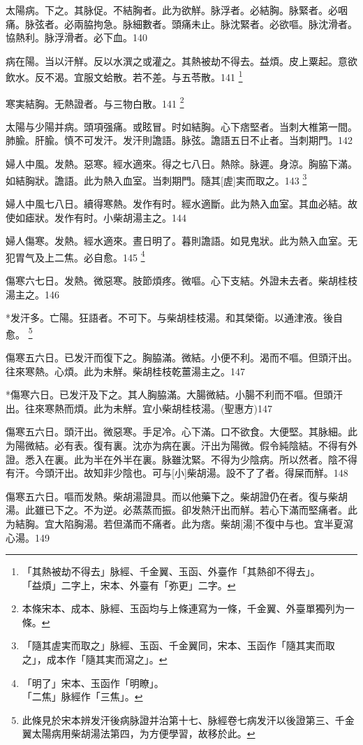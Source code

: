 \documentclass[12pt,twoside,UTF8,b5paper]{ctexbook}
\begin{document}
太陽病。下之。其脉促。不結胸者。此为欲觧。脉浮者。必結胸。脉緊者。必咽痛。脉弦者。必兩脇拘急。脉細數者。頭痛未止。脉沈緊者。必欲嘔。脉沈滑者。協熱利。脉浮滑者。必下血。140

病在陽。当以汗觧。反以水潠之或灌之。其熱被劫不得去。益煩。皮上粟起。意欲飲水。反不渴。宜服文蛤散。若不差。与五苓散。141
	\footnote{「其熱被劫不得去」脉經、千金翼、玉函、外臺作「其熱卻不得去」。\\「益煩」二字上，宋本、外臺有「弥更」二字。}

寒実結胸。无熱證者。与三物白散。141
	\footnote{本條宋本、成本、脉經、玉函均与上條連寫为一條，千金翼、外臺單獨列为一條。}

太陽与少陽并病。頭項强痛。或眩冒。时如結胸。心下痞堅者。当刺大椎第一間。肺腧。肝腧。慎不可发汗。发汗則譫語。脉弦。譫語五日不止者。当刺期門。142

婦人中風。发熱。惡寒。經水適來。得之七八日。熱除。脉遲。身涼。胸脇下滿。如結胸狀。譫語。此为熱入血室。当刺期門。隨其[虗]実而取之。143
	\footnote{「隨其虗実而取之」脉經、玉函、千金翼同，宋本、玉函作「隨其実而取之」，成本作「隨其実而瀉之」。}

婦人中風七八日。續得寒熱。发作有时。經水適斷。此为熱入血室。其血必結。故使如瘧狀。发作有时。小柴胡湯主之。144

婦人傷寒。发熱。經水適來。晝日明了。暮則譫語。如見鬼狀。此为熱入血室。无犯胃气及上二焦。必自愈。145
	\footnote{「明了」宋本、玉函作「明瞭」。\\「二焦」脉經作「三焦」。}

傷寒六七日。发熱。微惡寒。肢節煩疼。微嘔。心下支結。外證未去者。柴胡桂枝湯主之。146

*发汗多。亡陽。狂語者。不可下。与柴胡桂枝湯。和其榮衛。以通津液。後自愈。
	\footnote{此條見於宋本辨发汗後病脉證并治第十七、脉經卷七病发汗以後證第三、千金翼太陽病用柴胡湯法第四，为方便學習，故移於此。}

傷寒五六日。已发汗而復下之。胸脇滿。微結。小便不利。渴而不嘔。但頭汗出。往來寒熱。心煩。此为未觧。柴胡桂枝乾薑湯主之。147

*傷寒六日。已发汗及下之。其人胸脇滿。大腸微結。小腸不利而不嘔。但頭汗出。往來寒熱而煩。此为未觧。宜小柴胡桂枝湯。(聖惠方)147

傷寒五六日。頭汗出。微惡寒。手足冷。心下滿。口不欲食。大便堅。其脉細。此为陽微結。必有表。復有裏。沈亦为病在裏。汗出为陽微。假令純陰結。不得有外證。悉入在裏。此为半在外半在裏。脉雖沈緊。不得为少陰病。所以然者。陰不得有汗。今頭汗出。故知非少陰也。可与[小]柴胡湯。設不了了者。得屎而觧。148

傷寒五六日。嘔而发熱。柴胡湯證具。而以他藥下之。柴胡證仍在者。復与柴胡湯。此雖已下之。不为逆。必蒸蒸而振。卻发熱汗出而觧。若心下滿而堅痛者。此为結胸。宜大陷胸湯。若但滿而不痛者。此为痞。柴胡[湯]不復中与也。宜半夏瀉心湯。149
\end{document}
